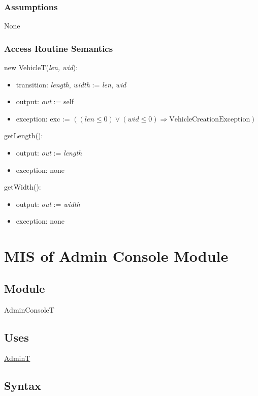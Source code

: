 \documentclass[12pt, titlepage]{article}
\begin{document}
\subsubsection{Assumptions}
None

\subsubsection{Access Routine Semantics}

\noindent new VehicleT(\textit{len, wid}):
\begin{itemize}
\item transition: \textit{length}, \textit{width} := \textit{len}, \textit{wid} 
\item output: \textit{out} := self
\item exception: exc := $((len \leq 0) \vee (wid \leq 0) \Rightarrow
\text{VehicleCreationException})$
\end{itemize}

\noindent getLength():
\begin{itemize} 
\item output: \textit{out} := \textit{length} 
\item exception: none
\end{itemize}

\noindent getWidth():
\begin{itemize} 
\item output: \textit{out} := \textit{width} 
\item exception: none
\end{itemize}

\newpage

\section{MIS of Admin Console Module} 
\label{adminConsole:Module}

\subsection{Module}
AdminConsoleT

\subsection{Uses}
\hyperref[admin:Module]{AdminT}

\subsection{Syntax}
\end{document}
